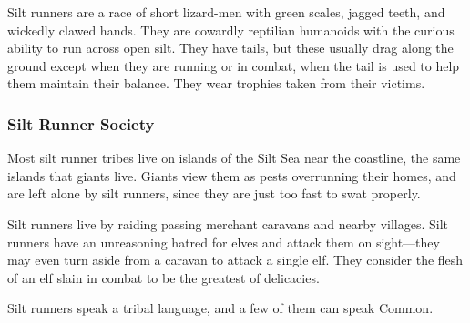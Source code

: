 Silt runners are a race of short lizard-men with green scales, jagged teeth, and wickedly clawed hands. They are cowardly reptilian humanoids with the curious ability to run across open silt. They have tails, but these usually drag along the ground except when they are running or in combat, when the tail is used to help them maintain their balance. They wear trophies taken from their victims.

\subsubsection{Silt Runner Society}
Most silt runner tribes live on islands of the Silt Sea near the coastline, the same islands that giants live. Giants view them as pests overrunning their homes, and are left alone by silt runners, since they are just too fast to swat properly.

Silt runners live by raiding passing merchant caravans and nearby villages. Silt runners have an unreasoning hatred for elves and attack them on sight---they may even turn aside from a caravan to attack a single elf. They consider the flesh of an elf slain in combat to be the greatest of delicacies.

Silt runners speak a tribal language, and a few of them can
speak Common.


